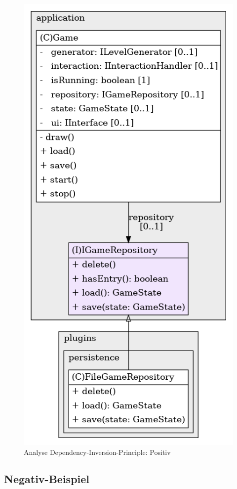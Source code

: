 \enlargethispage*{2\baselineskip}
\vspace{0.5cm}
\begin{figure}[H]
    \centering
    \includegraphics[width=0.3\linewidth]{Bilder/Visualisierung/IGameRepository_structure.png}
    \caption{Analyse Dependency-Inversion-Principle: Positiv}
\end{figure}

\subsection{Negativ-Beispiel}